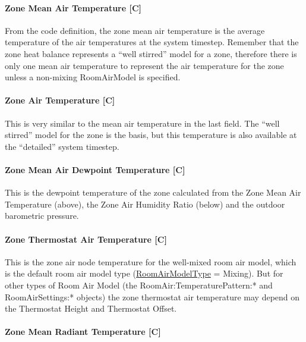 \paragraph{Zone Mean Air Temperature {[}C{]}}\label{zone-mean-air-temperature-c}

From the code definition, the zone mean air temperature is the average temperature of the air temperatures at the system timestep. Remember that the zone heat balance represents a ``well stirred'' model for a zone, therefore there is only one mean air temperature to represent the air temperature for the zone unless a non-mixing RoomAirModel is specified.

\paragraph{Zone Air Temperature {[}C{]}}\label{zone-air-temperature-c}

This is very similar to the mean air temperature in the last field. The ``well stirred'' model for the zone is the basis, but this temperature is also available at the ``detailed'' system timestep.

\paragraph{Zone Mean Air Dewpoint Temperature {[}C{]}}\label{zone-mean-air-dewpoint-temperature-c}

This is the dewpoint temperature of the zone calculated from the Zone Mean Air Temperature (above), the Zone Air Humidity Ratio (below) and the outdoor barometric pressure.

\paragraph{Zone Thermostat Air Temperature {[}C{]}}\label{zone-thermostat-air-temperature-c}

This is the zone air node temperature for the well-mixed room air model, which is the default room air model type (\hyperref[roomairmodeltype]{RoomAirModelType} = Mixing). But for other types of Room Air Model (the RoomAir:TemperaturePattern:* and RoomAirSettings:* objects) the zone thermostat air temperature may depend on the Thermostat Height and Thermostat Offset.

\paragraph{Zone Mean Radiant Temperature {[}C{]}}\label{zone-mean-radiant-temperature-c}

